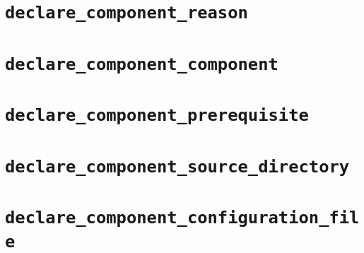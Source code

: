 \section{\texttt{declare\_component\_reason}}\label{api:declare-component-reaso}
\section{\texttt{declare\_component\_component}}\label{api:declare-component-component}
\section{\texttt{declare\_component\_prerequisite}}\label{api:declare-component-prerequisite}
\section{\texttt{declare\_component\_source\_directory}}\label{api:declare-component-source-directory}
\section{\texttt{declare\_component\_configuration\_file}}\label{api:declare-component-configuration-file}
